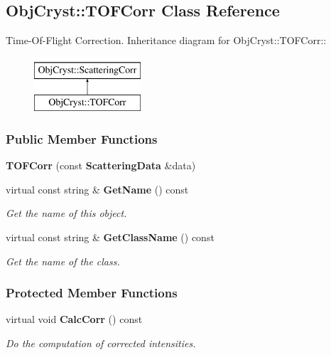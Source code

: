 \subsection{ObjCryst::TOFCorr Class Reference}
\label{a00105}


Time-\/Of-\/Flight Correction.  
Inheritance diagram for ObjCryst::TOFCorr::\begin{figure}[H]
\begin{center}
\leavevmode
\includegraphics[height=2cm]{a00105}
\end{center}
\end{figure}
\subsubsection*{Public Member Functions}
\begin{DoxyCompactItemize}
\item 
{\bfseries TOFCorr} (const {\bf ScatteringData} \&data)\label{a00105_afceb96fa351306b6bb3ca787dc56d5fc}

\item 
virtual const string \& {\bf GetName} () const \label{a00105_a6638348a144ef78b7d40448869c8c220}

\begin{DoxyCompactList}\small\item\em Get the name of this object. \item\end{DoxyCompactList}\item 
virtual const string \& {\bf GetClassName} () const \label{a00105_a9eecdda6f5d0ae119334e54043d1d7d6}

\begin{DoxyCompactList}\small\item\em Get the name of the class. \item\end{DoxyCompactList}\end{DoxyCompactItemize}
\subsubsection*{Protected Member Functions}
\begin{DoxyCompactItemize}
\item 
virtual void {\bf CalcCorr} () const \label{a00105_ae0a0c31d2edc029708722f00e05a5edf}

\begin{DoxyCompactList}\small\item\em Do the computation of corrected intensities. \item\end{DoxyCompactList}\end{DoxyCompactItemize}


